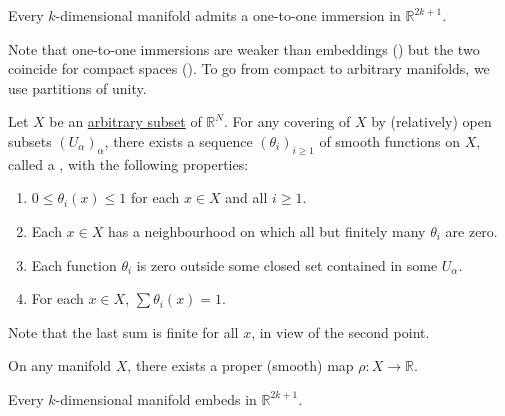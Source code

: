 \begin{thm}
	Every $k$-dimensional manifold admits a one-to-one immersion in $\mathbb{R}^{2k + 1}$.
\end{thm}
Note that one-to-one immersions are weaker than embeddings () but the two coincide for compact spaces (). To go from compact to arbitrary manifolds, we use partitions of unity.

\begin{thm}
	Let $X$ be an \underline{arbitrary subset} of $\mathbb{R}^{N}$. For any covering of $X$ by (relatively) open subsets $(U_{\alpha})_{\alpha}$, there exists a sequence $(\theta_{i})_{i \ge 1}$ of smooth functions on $X$, called a , with the following properties:
	\begin{enumerate}
		\item $0 \le \theta_{i}(x) \le 1$ for each $x \in X$ and all $i \ge 1$.
		\item Each $x \in X$ has a neighbourhood on which all but finitely many $\theta_{i}$ are zero.
		\item Each function $\theta_{i}$ is zero outside some closed set contained in some $U_{\alpha}$.
		\item For each $x \in X$, $\sum \theta_{i}(x) = 1$.	
	\end{enumerate}
\end{thm}
Note that the last sum is finite for all $x$, in view of the second point.

\begin{cor}
	On any manifold $X$, there exists a proper (smooth) map $\rho : X \to \mathbb{R}$.
\end{cor}

\begin{thm}
	Every $k$-dimensional manifold embeds in $\mathbb{R}^{2k + 1}$.
\end{thm}
